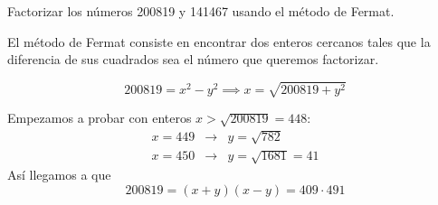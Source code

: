 \begin{problem}[4]
 Factorizar los n\'umeros 200819 y 141467 usando el m\'etodo de Fermat.
\solution


El método de Fermat consiste en encontrar dos enteros cercanos tales que la diferencia de sus cuadrados sea el número que queremos factorizar.

\[200819 = x^2 - y^2 \implies x = \sqrt{200819+y^2}\]

Empezamos a probar con enteros $x>\sqrt{200819}=448$:
\[\begin{array}{lcl}
x=449 & \to & y=\sqrt{782}\\
x=450 & \to & y=\sqrt{1681} = 41
\end{array}\]
Así llegamos a que
\[200819 = (x+y)(x-y) = 409 \cdot 491\]


\end{problem}
